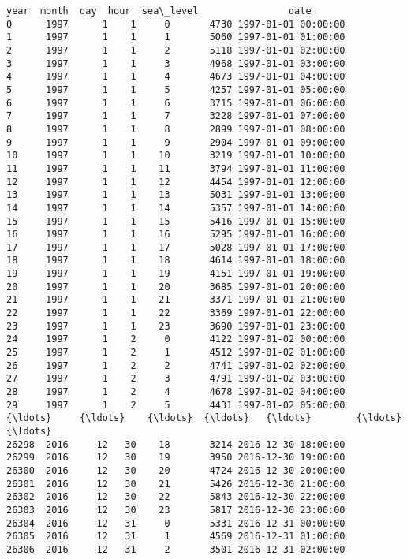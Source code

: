 \documentclass[11pt]{article}
\begin{document}
    \begin{Verbatim}[commandchars=\\\{\}]
       year  month  day  hour  sea\_level                date
0      1997      1    1     0       4730 1997-01-01 00:00:00
1      1997      1    1     1       5060 1997-01-01 01:00:00
2      1997      1    1     2       5118 1997-01-01 02:00:00
3      1997      1    1     3       4968 1997-01-01 03:00:00
4      1997      1    1     4       4673 1997-01-01 04:00:00
5      1997      1    1     5       4257 1997-01-01 05:00:00
6      1997      1    1     6       3715 1997-01-01 06:00:00
7      1997      1    1     7       3228 1997-01-01 07:00:00
8      1997      1    1     8       2899 1997-01-01 08:00:00
9      1997      1    1     9       2904 1997-01-01 09:00:00
10     1997      1    1    10       3219 1997-01-01 10:00:00
11     1997      1    1    11       3794 1997-01-01 11:00:00
12     1997      1    1    12       4454 1997-01-01 12:00:00
13     1997      1    1    13       5031 1997-01-01 13:00:00
14     1997      1    1    14       5357 1997-01-01 14:00:00
15     1997      1    1    15       5416 1997-01-01 15:00:00
16     1997      1    1    16       5295 1997-01-01 16:00:00
17     1997      1    1    17       5028 1997-01-01 17:00:00
18     1997      1    1    18       4614 1997-01-01 18:00:00
19     1997      1    1    19       4151 1997-01-01 19:00:00
20     1997      1    1    20       3685 1997-01-01 20:00:00
21     1997      1    1    21       3371 1997-01-01 21:00:00
22     1997      1    1    22       3369 1997-01-01 22:00:00
23     1997      1    1    23       3690 1997-01-01 23:00:00
24     1997      1    2     0       4122 1997-01-02 00:00:00
25     1997      1    2     1       4512 1997-01-02 01:00:00
26     1997      1    2     2       4741 1997-01-02 02:00:00
27     1997      1    2     3       4791 1997-01-02 03:00:00
28     1997      1    2     4       4678 1997-01-02 04:00:00
29     1997      1    2     5       4431 1997-01-02 05:00:00
{\ldots}     {\ldots}    {\ldots}  {\ldots}   {\ldots}        {\ldots}                 {\ldots}
26298  2016     12   30    18       3214 2016-12-30 18:00:00
26299  2016     12   30    19       3950 2016-12-30 19:00:00
26300  2016     12   30    20       4724 2016-12-30 20:00:00
26301  2016     12   30    21       5426 2016-12-30 21:00:00
26302  2016     12   30    22       5843 2016-12-30 22:00:00
26303  2016     12   30    23       5817 2016-12-30 23:00:00
26304  2016     12   31     0       5331 2016-12-31 00:00:00
26305  2016     12   31     1       4569 2016-12-31 01:00:00
26306  2016     12   31     2       3501 2016-12-31 02:00:00

\end{Verbatim}
\end{document}
